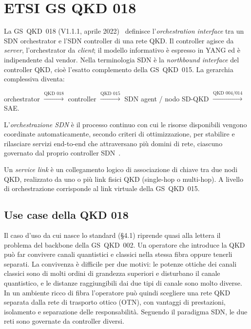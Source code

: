 \section{ETSI GS QKD 018}
\label{sec:qkd018}

La GS~QKD~018 (V1.1.1, aprile 2022)~\cite{qkd018} definisce
l'\emph{orchestration interface} tra un SDN orchestrator e l'SDN controller
di una rete QKD. Il controller agisce da \emph{server}, l'orchestrator da
\emph{client}; il modello informativo è espresso in YANG ed è indipendente
dal vendor. Nella terminologia SDN è la \emph{northbound interface} del
controller QKD, cioè l'esatto complemento della GS~QKD~015. La gerarchia
complessiva diventa:
\begin{center}
\small
orchestrator $\xrightarrow{\text{QKD 018}}$ controller
$\xrightarrow{\text{QKD 015}}$ SDN agent / nodo SD-QKD
$\xrightarrow{\text{QKD 004/014}}$ SAE.
\end{center}

\begin{definition}
L'\emph{orchestrazione SDN} è il processo continuo con cui le risorse
disponibili vengono coordinate automaticamente, secondo criteri di
ottimizzazione, per stabilire e rilasciare servizi end-to-end che
attraversano più domini di rete, ciascuno governato dal proprio controller
SDN~\cite[§4.2]{qkd018}.
\end{definition}

\begin{definition}
Un \emph{service link} è un collegamento logico di associazione di chiave
tra due nodi QKD, realizzato da uno o più link fisici QKD (single-hop o
multi-hop). A livello di orchestrazione corrisponde al link virtuale della
GS~QKD~015.
\end{definition}



\subsection{Use case della QKD 018}
\label{sec:usecase018}

Il caso d'uso da cui nasce lo standard (§4.1) riprende quasi alla lettera
il problema del backbone della GS~QKD~002. Un operatore che introduce la
QKD può far convivere canali quantistici e classici nella stessa fibra
oppure tenerli separati. La convivenza è difficile per due motivi: le
potenze ottiche dei canali classici sono di molti ordini di grandezza
superiori e disturbano il canale quantistico, e le distanze raggiungibili
dai due tipi di canale sono molto diverse. In un ambiente ricco di fibra
l'operatore può quindi scegliere una rete QKD separata dalla rete di
trasporto ottico (OTN), con vantaggi di prestazioni, isolamento e
separazione delle responsabilità. Seguendo il paradigma SDN, le due reti
sono governate da controller diversi.

